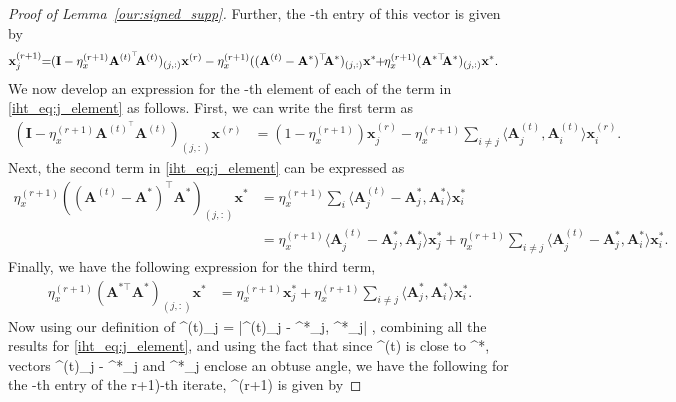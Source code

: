 \documentclass{article}
\def\[#1\]{{$#1$}}
\def\b#1{{\mathbf{#1}}}
\begin{document}
\begin{proof}[Proof of Lemma~\ref{our:signed_supp}]
	Further, the \[j\]-th entry of this vector is given by
	\begin{align}
	\label{iht_eq:j_element}
	\b{x}^{(r+1)}_{j} \hspace{-3pt}= \hspace{-3pt}(\b{I} - \eta_{x}^{(r+1)} \b{A}^{(t)^\top}\hspace{-3pt}\b{A}^{(t)})_{(j,:)}\b{x}^{(r)} - \eta_{x}^{(r+1)} &((\b{A}^{(t)} - \b{A}^{*})^{\top}\hspace{-3pt}\b{A}^*)_{(j,:)}\b{x}^*  \hspace{-3pt}+\hspace{-3pt} \eta_{x}^{(r+1)}(\b{A}^{*\top}\hspace{-3pt}\b{A}^*)_{(j,:)}\b{x}^*.
	\end{align}
	We now develop an expression for the \[j\]-th element of each of the term in \eqref{iht_eq:j_element} as follows. First, we can write the first term as
	\begin{align*}
	(\b{I} - \eta_{x}^{(r+1)}\b{A}^{(t)^\top}\b{A}^{(t)})_{(j,:)}\b{x}^{(r)} & = (1 - \eta_{x}^{(r+1)}) \b{x}_j^{(r)} - \eta_{x}^{(r+1)}\textstyle\sum\limits_{i \neq j}  \langle \b{A}^{(t)}_j, \b{A}^{(t)}_i \rangle\b{x}_i^{(r)}.
	\end{align*}
	Next, the second term in \eqref{iht_eq:j_element} can be expressed as
	\begin{align*}
	\eta_{x}^{(r+1)} ((\b{A}^{(t)} - \b{A}^{*})^{\top}\b{A}^*)_{(j,:)}\b{x}^* &= \eta_{x}^{(r+1)}\textstyle\sum\limits_{i} \langle \b{A}^{(t)}_j - \b{A}^{*}_j, \b{A}^*_i\rangle \b{x}_i^*\\
	&= \eta_{x}^{(r+1)}\langle \b{A}^{(t)}_j - \b{A}^{*}_j, \b{A}^*_j\rangle \b{x}_j^* + \eta_{x}^{(r+1)}\textstyle\sum\limits_{i\neq j} \langle \b{A}^{(t)}_j - \b{A}^{*}_j, \b{A}^*_i\rangle \b{x}_i^*.
	\end{align*}
	Finally, we have the following expression for the third term,
	\begin{align*}
	\eta_{x}^{(r+1)}(\b{A}^{*\top}\b{A}^*)_{(j,:)}\b{x}^* &= \eta_{x}^{(r+1)} \b{x}_j^* + \eta_{x}^{(r+1)}\textstyle\sum\limits_{i \neq j} \langle \b{A}^*_j, \b{A}^*_i \rangle \b{x}^*_i. 
	
	\end{align*}
	Now using our definition of  \[\lambda^{(t)}_j = |\langle \b{A}^{(t)}_j - \b{A}^{*}_j, \b{A}^*_j\rangle| \leq {}\], combining all the results for \eqref{iht_eq:j_element}, and using the fact that since \[\b{A}^{(t)}\] is close to \[\b{A}^*\], vectors \[\b{A}^{(t)}_j - \b{A}^{*}_j\] and \[\b{A}^*_j\] enclose an obtuse angle, we have the following for  the \[j\]-th entry of the \[(r+1)\]-th iterate, \[\b{x}^{(r+1)}\] is given by







\end{proof}
\end{document}
